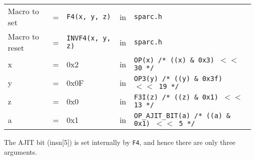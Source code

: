 \begin{enumerate}
  \begin{tabular}[h]{lclcl}
    Macro to set  &=& \texttt{F4(x, y, z)} &in& \texttt{sparc.h}     \\
    Macro to reset  &=& \texttt{INVF4(x, y, z)} &in& \texttt{sparc.h}     \\
    x &=& 0x2      &in& \texttt{OP(x)  /* ((x) \& 0x3)  $<<$ 30 */} \\
    y &=& 0x0F     &in& \texttt{OP3(y) /* ((y) \& 0x3f) $<<$ 19 */} \\
    z &=& 0x0      &in& \texttt{F3I(z) /* ((z) \& 0x1)  $<<$ 13 */} \\
    a &=& 0x1      &in& \texttt{OP\_AJIT\_BIT(a) /* ((a) \& 0x1)  $<<$ 5 */}
  \end{tabular}

  The AJIT bit  (insn[5]) is set internally by  \texttt{F4}, and hence
  there are only three arguments.


\end{enumerate}
